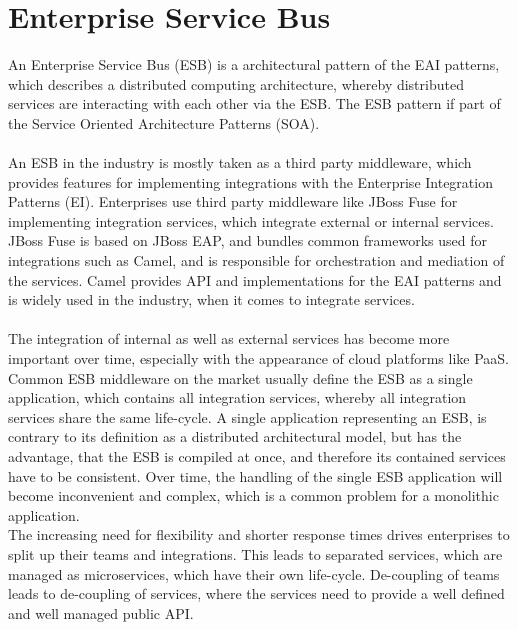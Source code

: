 \chapter{Enterprise Service Bus}
\label{cha:esb}
An Enterprise Service Bus (ESB) is a architectural pattern of the EAI patterns, which describes a distributed computing architecture, whereby distributed services are interacting with each other via the ESB. The ESB pattern if part of the Service Oriented Architecture Patterns (SOA).   
\\ \\
An ESB in the industry is mostly taken as a third party middleware, which provides features for implementing integrations with the Enterprise Integration Patterns (EI). Enterprises use third party middleware like JBoss Fuse for implementing integration services, which integrate external or internal services. JBoss Fuse is based on JBoss EAP, and bundles common frameworks used for integrations such as Camel, and is responsible for orchestration and mediation of the services. Camel provides API and implementations for the EAI patterns and is widely used in the industry, when it comes to integrate services\cite{CamelIA2018, Camel2015}.
\\ \\
The integration of internal as well as external services has become more important over time, especially with the appearance of cloud platforms like PaaS. Common ESB middleware on the market usually define the ESB as a single application, which contains all integration services, whereby all integration services share the same life-cycle. A single application representing an ESB, is contrary to its definition as a distributed architectural model, but has the advantage, that the ESB is compiled at once, and therefore its contained services have to be consistent. Over time, the handling of the single ESB application will become inconvenient and complex, which is a common problem for a monolithic application.  \\

The increasing need for flexibility and shorter response times drives enterprises to split up their teams and integrations. This leads to separated services, which are managed as microservices, which have their own life-cycle. De-coupling of teams leads to de-coupling of services, where the services need to provide a well defined and well managed public API\cite{Camel2015, RedHatAgileIntegration2017, EIP}.

